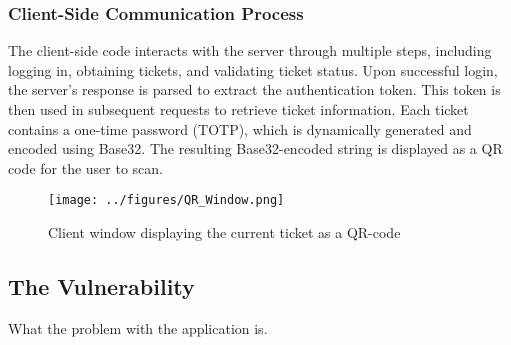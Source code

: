 \subsubsection{Client-Side Communication Process}
The client-side code interacts with the server through multiple steps, including logging in, obtaining tickets, and validating ticket status. Upon successful login, the server's response is parsed to extract the authentication token. This token is then used in subsequent requests to retrieve ticket information. Each ticket contains a one-time password (TOTP), which is dynamically generated and encoded using Base32. The resulting Base32-encoded string is displayed as a QR code for the user to scan.

\begin{figure}[H]
    \centering
    \texttt{[image: ../figures/QR\_Window.png]}
    \caption{Client window displaying the current ticket as a QR-code}
    \label{fig:WorkFlow1}
\end{figure}

\subsection{The Vulnerability}
What the problem with the application is.

